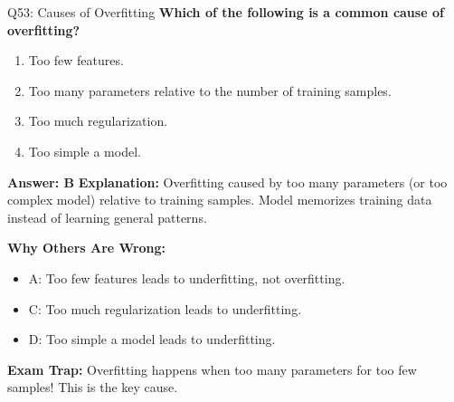 \documentclass[8pt]{beamer}
\begin{document}
	\begin{frame}{Q53: Causes of Overfitting}
		\fontsize{6.5}{7.5}\selectfont
		\textbf{Which of the following is a common cause of overfitting?}
		
		\begin{enumerate}
			\item Too few features.
			\item Too many parameters relative to the number of training samples.
			\item Too much regularization.
			\item Too simple a model.
		\end{enumerate}
		
		\vspace{0.05cm}
		\textcolor{myblue}{\textbf{Answer: B}}
		\vspace{0.05cm}
		\textcolor{myblue}{\textbf{Explanation:}} Overfitting caused by too many parameters (or too complex model) relative to training samples. Model memorizes training data instead of learning general patterns.
		
		\vspace{0.05cm}
		\textcolor{myred}{\textbf{Why Others Are Wrong:}}
		\begin{itemize}
			\item \textcolor{myred}{A:} Too few features leads to underfitting, not overfitting.
			\item \textcolor{myred}{C:} Too much regularization leads to underfitting.
			\item \textcolor{myred}{D:} Too simple a model leads to underfitting.
		\end{itemize}
		
		\textcolor{myred}{\textbf{Exam Trap:}} Overfitting happens when \textcolor{myblue}{too many parameters for too few samples}! This is the key cause.
	\end{frame}
	
\end{document}

